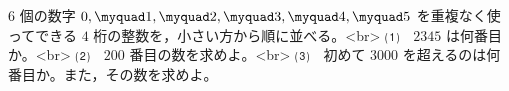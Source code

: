 $6$ 個の数字 $0,\myquad 1,\myquad 2,\myquad 3,\myquad 4,\myquad 5$ 
を重複なく使ってできる $4$ 桁の整数を，小さい方から順に並べる。<br>
⑴　$2345$ は何番目か。<br>
⑵　$200$ 番目の数を求めよ。<br>
⑶　初めて $3000$ を超えるのは何番目か。また，その数を求めよ。 